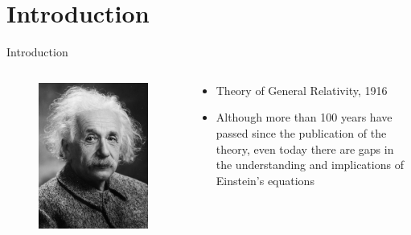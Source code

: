 \documentclass{beamer}
\begin{document}
\section{Introduction}
\begin{frame}{Introduction}
	\begin{columns}
		\begin{column}{0.5\textwidth}
			\begin{figure}[h]
				\centering
				\includegraphics[width=0.9\linewidth]{images/Albert_Einstein_Head}
			\end{figure}
		\end{column}
		\begin{column}{0.5\textwidth}
			\begin{itemize}
				\item Theory of General Relativity, 1916
				\item Although more than 100 years have passed since the publication of the theory, even today there are gaps in the understanding and implications of Einstein's equations
			\end{itemize}
		\end{column}
	\end{columns}
\end{frame}
\end{document}

